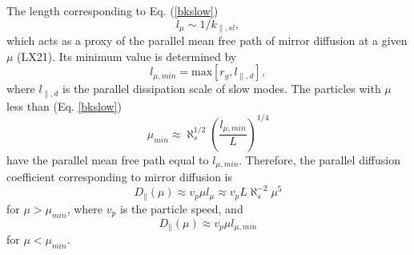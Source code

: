 \documentclass[preprint2,twocolumn,times,tighten]{aastex63}
\begin{document}
The length corresponding to 
Eq. (\ref{bkslow})  
\begin{equation}
l_\mu \sim 1/k_{\|,sl},
\label{lmu}
\end{equation}
which acts as a proxy of the parallel mean free path of mirror diffusion at a given $\mu$ (LX21). 
{Its minimum value is determined by} 
\begin{equation}
 l_{\mu,min} = \text{max} [r_g, l_{\|,d}],
\end{equation}
where $l_{\|,d}$ is the parallel dissipation scale of slow modes. 
The particles with $\mu$ less than  
(Eq. \eqref{bkslow})
\begin{equation}
    \mu_{min}\approx \aleph_s^{1/2}\left(\frac{l_{\mu, min}}{L}\right)^{1/4}
\end{equation}
have the parallel mean free path equal to $l_{\mu,min}$.
Therefore, the parallel diffusion coefficient corresponding to mirror diffusion is 
\begin{equation}
    D_\| (\mu) \approx  v_p \mu l_\mu\approx v_p L \aleph_s^{-2} \mu^5  
    \label{Dpar}
\end{equation}
for $\mu > \mu_{min}$, 
where $v_p$ is the particle speed, and 
\begin{equation}
    D_\| (\mu) \approx  v_p \mu l_{\mu, min}
    \label{Dpar2}
\end{equation}
for $\mu < \mu_{min}$.



\end{document}

